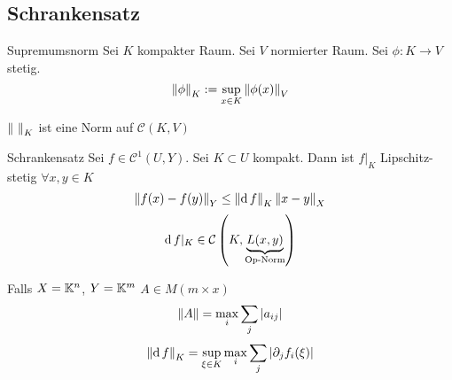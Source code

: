 \subsection{Schrankensatz}
\begin{Def}{Supremumsnorm}
  Sei $K$ kompakter Raum. Sei $V$ normierter Raum. Sei $\phi:K\to V$ stetig.
  \[\left\| \phi \right\|_K:=\sup_{x\in K}\left\| \phi(x) \right\|_V\]
\end{Def}
\begin{Lem}
  $\left\| \  \right\|_K$ ist eine Norm auf $\mathcal{C}\left( K,V \right)$
\end{Lem}
\begin{Sat}{Schrankensatz}
  Sei $f\in\mathcal{C}^1\left( U,Y \right)$. Sei $K\subset U$ kompakt. Dann ist $f|_K$ Lipschitz-stetig $\forall x,y\in K$
  \[\left\| f(x)-f(y) \right\|_Y\leq \left\| \operatorname{d} f \right\|_K\left\| x-y \right\|_X\]
  \[\operatorname{d} f|_K\in \mathcal{C}\left( K,\underbrace{L(x,y)}_{\text{Op-Norm}} \right)\]
\end{Sat}
\begin{Bem}
  Falls $X=\mathbb{K}^n$, $Y=\mathbb{K}^m$ $A\in M(m\times x)$
  \[\left\| A \right\|=\max_i\sum_j\left| a_{ij} \right|\]
  \[\left\| \operatorname{d} f \right\|_K=\sup_{\xi\in K}\max_i\sum_j\left| \partial_jf_i(\xi) \right|\]
\end{Bem}
